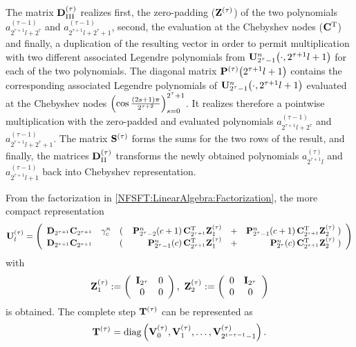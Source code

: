 The matrix $\mathbf{D}^{(\tau)}_{\text{III}}$ realizes 
first, the zero-padding ($\mathbf{Z}^{(\tau)}$) of the two polynomials $a^{(\tau-1)}_{2^{\tau+1}l+2^{\tau}}$ and 
$a^{(\tau-1)}_{2^{\tau+1}l+2^{\tau}+1}$, second, the evaluation at the Chebyshev nodes ($\mathbf{C}^{\text{\rm{T}}}$) 
and finally, a duplication of the resulting vector in order to permit multiplication with two different 
associated Legendre polynomials from $\mathbf{U}_{2^{\tau}-1}^{n}{\hspace{-0.4ex}}\left(\cdot,2^{\tau+1}l+1\right)$ for each of the 
two polynomials. The diagonal matrix $\mathbf{P}^{(\tau)}{\hspace{-0.4ex}}\left(2^{\tau+1}l+1\right)$ 
contains the corresponding associated Legendre polynomials of $\mathbf{U}_{2^{\tau}-1}^n{\hspace{-0.4ex}}\left(\cdot,2^{\tau+1}l+1\right)$ 
evaluated at the Chebyshev nodes $\left(\cos \frac{\left(2s+1\right)\pi}{2^{\tau+2}}\right)_{s=0}^{2^{\tau}+1}$. It realizes therefore 
a pointwise multiplication with the zero-padded and evaluated 
polynomials $a^{(\tau-1)}_{2^{\tau+1}l+2^{\tau}}$ and $a^{(\tau-1)}_{2^{\tau+1}l+2^{\tau}+1}$. The matrix $\mathbf{S}^{(\tau)}$ 
forms the sums for the two rows of the result, and finally, the matrices $\mathbf{D}^{(\tau)}_{\text{II}}$ transforms the newly obtained 
polynomials $a^{(\tau)}_{2^{\tau+1}l}$ and $a^{(\tau-1)}_{2^{\tau+1}l+1}$ back into Chebyshev representation.

From the factorization in \eqref{NFSFT:LinearAlgebra:Factorization}, the more compact representation
\begin{equation}
\nonumber
\mathbf{U}^{(\tau)}_l = 
\left(\begin{array}{lclrcr}
  \mathbf{D}_{2^{\tau+1}} \mathbf{C}_{2^{\tau+1}} & \gamma_{c}^n & \left(\right. & \mathbf{P}_{2^{\tau}-2}^n{\hspace{-0.4ex}}\left(c+1\right) \mathbf{C}^{\text{\rm{T}}}_{2^{\tau+1}} \mathbf{Z}_{1}^{(\tau)} & + & 
  \mathbf{P}_{2^{\tau}-1}^n{\hspace{-0.4ex}}\left(c+1\right) \mathbf{C}^{\text{\rm{T}}}_{2^{\tau+1}} \mathbf{Z}_{2}^{(\tau)} \left.\right) \\
  \mathbf{D}_{2^{\tau+1}} \mathbf{C}_{2^{\tau+1}} & & \left(\right. & \mathbf{P}_{2^{\tau}-1}^n{\hspace{-0.4ex}}\left(c\right) \mathbf{C}^{\text{\rm{T}}}_{2^{\tau+1}} \mathbf{Z}_{1}^{(\tau)} & + & 
  \mathbf{P}_{2^{\tau}}^n{\hspace{-0.4ex}}\left(c\right) \mathbf{C}^{\text{\rm{T}}}_{2^{\tau+1}} \mathbf{Z}_{2}^{(\tau)} \left.\right)
\end{array}\right)
\end{equation}
with 
\[
  \mathbf{Z}_{1}^{(\tau)} := 
    \left(\begin{array}{cc}
      \mathbf{I}_{2^{\tau}} & 0\\
      0 & 0
    \end{array}\right),\
  \mathbf{Z}_{2}^{(\tau)} := 
    \left(\begin{array}{cc}
      0 & \mathbf{I}_{2^{\tau}} \\
      0 & 0
    \end{array}\right)    
\]
is obtained.
The complete step $\mathbf{T}^{(\tau)}$ can be represented as 
\[
  \mathbf{T}^{(\tau)} = \text{diag}\left(\mathbf{V}^{(\tau)}_0,\mathbf{V}^{(\tau)}_1,\dots,\mathbf{V}^{(\tau)}_{2^{t-\tau-1}-1}\right).
\]

